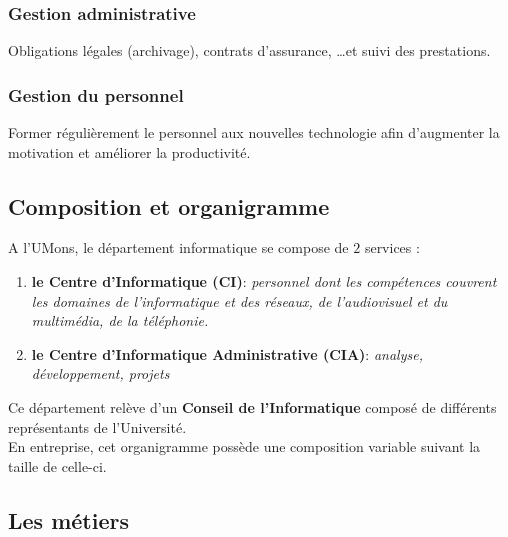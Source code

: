 \documentclass[10pt,a4paper,oneside,titlepage]{report}
\newcommand{\firebrick}[1]{\textcolor{firebrick4}{#1}}
\newcommand{\titre}[1]{\textcolor{title}{#1}}
\newcommand{\newterm}[1]{\textit{#1}}
\newcommand{\strong}[1]{\textbf{\titre{#1}}}
\begin{document}
\subsubsection{Gestion administrative}

Obligations légales (archivage), contrats d'assurance, \dots et suivi des
prestations.

\subsubsection{Gestion du personnel}

Former régulièrement le personnel aux nouvelles technologie afin d'augmenter la
motivation et améliorer la productivité.

\subsection{Composition et organigramme}

\noindent A l'UMons, le département informatique se compose de $2$ services :
\begin{enumerate}
\item \textbf{\strong{le Centre d'Informatique} (\firebrick{CI})}:
\newterm{personnel dont les compétences couvrent les domaines de l'informatique
et des réseaux, de l'audiovisuel et du multimédia, de la téléphonie.}
\item \textbf{\strong{le Centre d'Informatique Administrative}
(\firebrick{CIA})}: \newterm{analyse, développement, projets}
\end{enumerate}

Ce département relève d'un \strong{Conseil de l'Informatique} composé de
différents représentants de l'Université.\\

En entreprise, cet organigramme possède une composition variable suivant la
taille de celle-ci.

\subsection{Les métiers}
\end{document}
